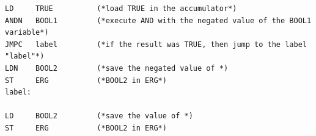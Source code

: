 \lstset{language=[x86masm]Assembler}
\begin{lstlisting}[caption={Example of~\gls{acn:IL} code. Source:~\cite{Beckhoff:IL}},label=lst:ex:il]
LD     TRUE          (*load TRUE in the accumulator*)
ANDN   BOOL1         (*execute AND with the negated value of the BOOL1 variable*)
JMPC   label         (*if the result was TRUE, then jump to the label "label"*)
LDN    BOOL2         (*save the negated value of *)
ST     ERG           (*BOOL2 in ERG*)
label:

LD     BOOL2         (*save the value of *)
ST     ERG           (*BOOL2 in ERG*)
\end{lstlisting}